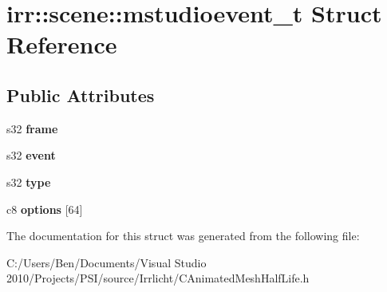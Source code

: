 \hypertarget{structirr_1_1scene_1_1mstudioevent__t}{\section{irr\-:\-:scene\-:\-:mstudioevent\-\_\-t Struct Reference}
\label{structirr_1_1scene_1_1mstudioevent__t}
}
\subsection*{Public Attributes}
\begin{DoxyCompactItemize}
\item 
\hypertarget{structirr_1_1scene_1_1mstudioevent__t_a749f768468e241d293e2691661c88ac4}{s32 {\bfseries frame}}\label{structirr_1_1scene_1_1mstudioevent__t_a749f768468e241d293e2691661c88ac4}

\item 
\hypertarget{structirr_1_1scene_1_1mstudioevent__t_aae91e19d7551ed726d0df62015c59bfc}{s32 {\bfseries event}}\label{structirr_1_1scene_1_1mstudioevent__t_aae91e19d7551ed726d0df62015c59bfc}

\item 
\hypertarget{structirr_1_1scene_1_1mstudioevent__t_a94b1415e50154472de0afa9d2f9c786c}{s32 {\bfseries type}}\label{structirr_1_1scene_1_1mstudioevent__t_a94b1415e50154472de0afa9d2f9c786c}

\item 
\hypertarget{structirr_1_1scene_1_1mstudioevent__t_a3e41667f7f903dfae2b5d9d0c44fdcb2}{c8 {\bfseries options} \mbox{[}64\mbox{]}}\label{structirr_1_1scene_1_1mstudioevent__t_a3e41667f7f903dfae2b5d9d0c44fdcb2}

\end{DoxyCompactItemize}


The documentation for this struct was generated from the following file\-:\begin{DoxyCompactItemize}
\item 
C\-:/\-Users/\-Ben/\-Documents/\-Visual Studio 2010/\-Projects/\-P\-S\-I/source/\-Irrlicht/C\-Animated\-Mesh\-Half\-Life.\-h\end{DoxyCompactItemize}
